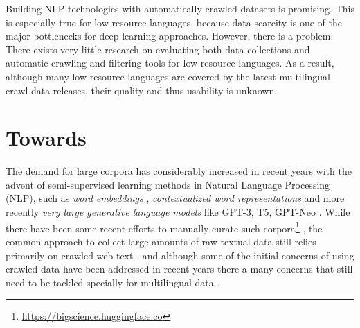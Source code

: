Building NLP technologies with automatically crawled datasets is promising. This is especially true for low-resource languages, because data scarcity is one of the major bottlenecks for deep learning approaches.
However, there is a problem: There exists very little research on evaluating both data collections and automatic crawling and filtering tools for low-resource languages.
As a result, although many low-resource languages are covered by the latest multilingual crawl data releases, their quality and thus usability is unknown.


\section{Towards}

The demand for large corpora has considerably increased in recent years with the advent of semi-supervised learning methods in Natural Language Processing (NLP), such as \emph{word embeddings} \cite{mikolov-etal-2013-distributed,pennington-etal-2014-glove,mikolov-etal-2018-advances}, \emph{contextualized word representations} \cite{howard-ruder-2018-universal,peters-etal-2018-deep,devlin-etal-2019-bert} and more recently \emph{very large generative language models} like GPT-3, T5, GPT-Neo \cite{raffel-etal-2020-exploring,brown-etal-2020-language,black-etal-2021-gpt}. While there have been some recent efforts to manually curate such corpora\footnote{\url{https://bigscience.huggingface.co}} \cite{gao-etal-2020-pile}, the common approach to collect large amounts of raw textual data still relies primarily on crawled web text \cite{ortiz-suarez-etal-2019-asynchronous,ortiz-suarez-etal-2020-monolingual,xue-etal-2021-mt5,el-kishky-etal-2020-ccaligned,espla-etal-2019-paracrawl,banon-etal-2020-paracrawl,gao-etal-2020-pile}, and although some of the initial concerns of using crawled data \cite{trinh-le-2018-a,radford-etal-2019-language} have been addressed in recent years \cite{ortiz-suarez-etal-2020-monolingual,martin-etal-2020-camembert} there a many concerns that still need to be tackled \cite{caswell-etal-2020-language} specially for multilingual data \cite{kreutzer-etal-2021-quality}.

